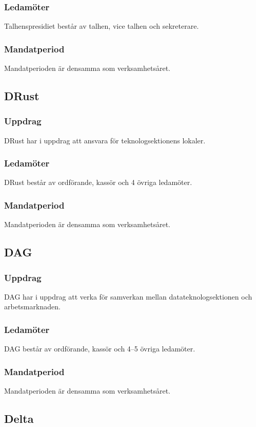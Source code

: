 \subsubsection{Ledamöter}
Talhenspresidiet består av talhen, vice talhen och sekreterare.
\subsubsection{Mandatperiod}
Mandatperioden är densamma som verksamhetsåret.

\subsection{DRust}
\subsubsection{Uppdrag}
DRust har i uppdrag att ansvara för teknologsektionens lokaler.
\subsubsection{Ledamöter}
DRust består av ordförande, kassör och 4 övriga ledamöter.
\subsubsection{Mandatperiod}
Mandatperioden är densamma som verksamhetsåret. 

\subsection{DAG}
\subsubsection{Uppdrag} 
DAG har i uppdrag att verka för samverkan mellan datateknologsektionen och arbetsmarknaden. 
\subsubsection{Ledamöter}
DAG består av ordförande, kassör och 4--5 övriga ledamöter.
\subsubsection{Mandatperiod}
Mandatperioden är densamma som verksamhetsåret.

\subsection{Delta}
